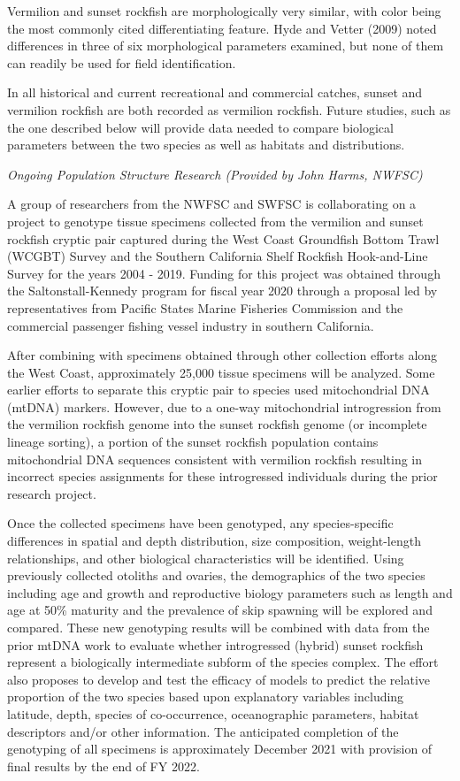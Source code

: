 \documentclass[11pt,
  english,
]{article}
\begin{document}
Vermilion and sunset rockfish are morphologically very similar, with color being the most commonly cited differentiating feature. Hyde and Vetter {(2009)\leavevmode\tagmcend\tagstructend} noted differences in three of six morphological parameters examined, but none of them can readily be used for field identification.

In all historical and current recreational and commercial catches, sunset and vermilion rockfish are both recorded as vermilion rockfish. Future studies, such as the one described below will provide data needed to compare biological parameters between the two species as well as habitats and distributions.

\emph{Ongoing Population Structure Research (Provided by John Harms, NWFSC)}

A group of researchers from the NWFSC and SWFSC is collaborating on a project to genotype tissue specimens collected from the vermilion and sunset rockfish cryptic pair captured during the West Coast Groundfish Bottom Trawl (WCGBT) Survey and the Southern California Shelf Rockfish Hook-and-Line Survey for the years 2004 - 2019. Funding for this project was obtained through the Saltonstall-Kennedy program for fiscal year 2020 through a proposal led by representatives from Pacific States Marine Fisheries Commission and the commercial passenger fishing vessel industry in southern California.

After combining with specimens obtained through other collection efforts along the West Coast, approximately 25,000 tissue specimens will be analyzed. Some earlier efforts to separate this cryptic pair to species used mitochondrial DNA (mtDNA) markers. However, due to a one-way mitochondrial introgression from the vermilion rockfish genome into the sunset rockfish genome (or incomplete lineage sorting), a portion of the sunset rockfish population contains mitochondrial DNA sequences consistent with vermilion rockfish resulting in incorrect species assignments for these introgressed individuals during the prior research project.

Once the collected specimens have been genotyped, any species-specific differences in spatial and depth distribution, size composition, weight-length relationships, and other biological characteristics will be identified. Using previously collected otoliths and ovaries, the demographics of the two species including age and growth and reproductive biology parameters such as length and age at 50\% maturity and the prevalence of skip spawning will be explored and compared. These new genotyping results will be combined with data from the prior mtDNA work to evaluate whether introgressed (hybrid) sunset rockfish represent a biologically intermediate subform of the species complex. The effort also proposes to develop and test the efficacy of models to predict the relative proportion of the two species based upon explanatory variables including latitude, depth, species of co-occurrence, oceanographic parameters, habitat descriptors and/or other information. The anticipated completion of the genotyping of all specimens is approximately December 2021 with provision of final results by the end of FY 2022.
\end{document}
